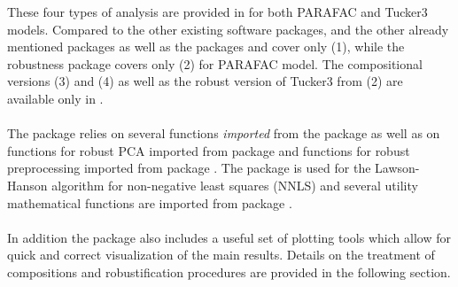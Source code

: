 \documentclass[article,shortnames, nojss]{jss}
\begin{document}
These four types of analysis are provided in  for both PARAFAC
and Tucker3 models. Compared to the other existing software packages,  and
the other already mentioned  packages as well as the  packages 
and  cover only (1), while the robustness  package 
covers only (2) for PARAFAC model. The compositional versions (3) and (4) as well as the
robust version of Tucker3 from (2) are available only in . \\\\
The package  relies on several functions \emph{imported} from
the package  as well as on functions for robust PCA imported
from package  \citep{todorov-oof} and functions for robust preprocessing
imported from package  \citep{robustbase}. The package 
\citep{mullen-nnls:2012} is used for the Lawson-Hanson algorithm for
non-negative least squares (NNLS) and several
utility mathematical functions are imported from package 
\citep{borchers-pracma:2021}.\\\\
In addition the package also includes a useful set of plotting tools which
allow for quick and correct visualization of the main results.
Details on the treatment of compositions and robustification
procedures are provided in the following section.
\end{document}
